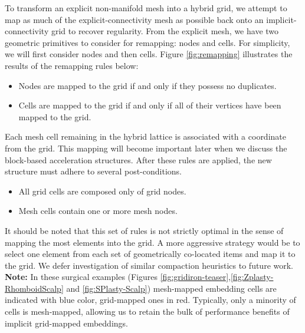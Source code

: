 To transform an explicit non-manifold mesh into a hybrid grid, we
attempt to map as much of the explicit-connectivity mesh as possible
back onto an implicit-connectivity grid to recover regularity. From
the explicit mesh, we have two geometric primitives to consider for
remapping: nodes and cells. For simplicity, we will first consider
nodes and then cells. Figure \ref{fig:remapping} illustrates the
results of the remapping rules below:
\begin{itemize}
\vspace*{-.05in}\item Nodes are mapped to the grid if and only if they possess no duplicates.
\vspace*{-.05in}\item Cells are mapped to the grid if and only if all of their vertices have been mapped to the grid.
\end{itemize}
\vspace*{-.05in} Each mesh cell remaining in the hybrid lattice is
associated with a coordinate from the grid. This mapping will become
important later when we discuss the block-based acceleration
structures.  After these rules are applied, the new structure must
adhere to several post-conditions.
\begin{itemize}
\vspace*{-.05in}\item All grid cells are composed only of grid nodes.
\vspace*{-.05in}\item Mesh cells contain one or more mesh nodes.
\end{itemize}
It should be noted that this set of rules is not strictly optimal in
the sense of mapping the most elements into the grid. A more
aggressive strategy would be to select one element from each set of
geometrically co-located items and map it to the grid. We defer
investigation of similar compaction heuristics to future work.
\textbf{Note:} In these surgical examples (Figures
\ref{fig:gridiron-teaser},\ref{fig:Zplasty-RhomboidScalp} and
\ref{fig:SPlasty-Scalp}) mesh-mapped embedding cells are indicated
with blue color, grid-mapped ones in red. Typically, only a minority
of cells is mesh-mapped, allowing us to retain the bulk of performance
benefits of implicit grid-mapped embeddings.



